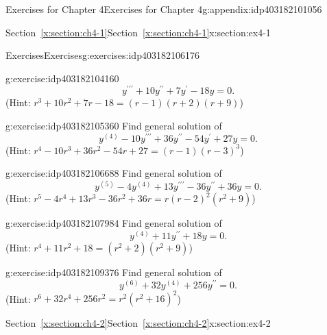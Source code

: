 \documentclass[oneside,10pt,]{book}
\newcommand{\xreffont}{\relax}
\numberwithin{equation}{section}
\numberwithin{equation}{section}
\begin{document}
\begin{appendixptx}{Exercises for Chapter 4}{}{Exercises for Chapter 4}{}{}{g:appendix:idp403182101056}
\begin{sectionptx}{Section~{\xreffont\ref*{x:section:ch4-1}}}{}{Section~{\xreffont\ref*{x:section:ch4-1}}}{}{}{x:section:ex4-1}
\begin{exercises-subsection-numberless}{Exercises}{}{Exercises}{}{}{g:exercises:idp403182106176}
\begin{divisionexercise}{2}{}{}{g:exercise:idp403182104160}
\begin{equation*}
y^{\prime\prime\prime}+10y^{\prime\prime}+7y^{\prime}-18y=0.
\end{equation*}
(Hint: \(r^{3}+10r^{2}+7r-18=\left(r-1\right)\left(r+2\right)\left(r+9\right)\))%
\end{divisionexercise}%
\begin{divisionexercise}{3}{}{}{g:exercise:idp403182105360}%
Find general solution of%
\begin{equation*}
y^{(4)}-10y^{\prime\prime\prime}+36y^{\prime\prime}-54y^{\prime}+27y=0.
\end{equation*}
(Hint: \(r^{4}-10r^{3}+36r^{2}-54r+27=\left(r-1\right)\left(r-3\right)^{3}\))%
\end{divisionexercise}%
\begin{divisionexercise}{4}{}{}{g:exercise:idp403182106688}%
Find general solution of%
\begin{equation*}
y^{(5)}-4y^{(4)}+13y^{\prime\prime\prime}-36y^{\prime\prime}+36y=0.
\end{equation*}
(Hint: \(r^{5}-4r^{4}+13r^{3}-36r^{2}+36r=r\left(r-2\right)^{2}\left(r^{2}+9\right)\))%
\end{divisionexercise}%
\begin{divisionexercise}{5}{}{}{g:exercise:idp403182107984}%
Find general solution of%
\begin{equation*}
y^{(4)}+11y^{\prime\prime}+18y=0.
\end{equation*}
(Hint: \(r^{4}+11r^{2}+18=\left(r^{2}+2\right)\left(r^{2}+9\right)\))%
\end{divisionexercise}%
\begin{divisionexercise}{6}{}{}{g:exercise:idp403182109376}%
Find general solution of%
\begin{equation*}
y^{(6)}+32y^{(4)}+256y^{\prime\prime}=0.
\end{equation*}
(Hint: \(r^{6}+32r^{4}+256r^{2}=r^{2}\left(r^{2}+16\right)^{2}\))%
\end{divisionexercise}%
\end{exercises-subsection-numberless}
\end{sectionptx}
%
%
\typeout{************************************************}
\typeout{Section E.2 Section~{\xreffont\ref*{x:section:ch4-2}}}
\typeout{************************************************}
%
\begin{sectionptx}{Section~{\xreffont\ref*{x:section:ch4-2}}}{}{Section~{\xreffont\ref*{x:section:ch4-2}}}{}{}{x:section:ex4-2}
%
%
\typeout{************************************************}

\end{sectionptx}
\end{appendixptx}
\end{document}

